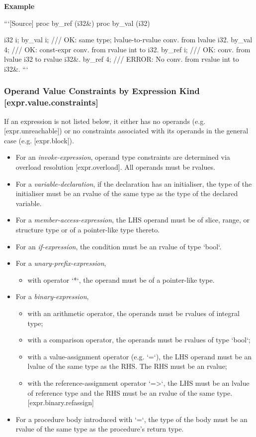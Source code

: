 \documentclass[a4paper, 12pt, oneside, final]{article}
\def\sref[#1]{[#1]}
\def\Example{\ifvmode\else\unskip\par\fi\noindent \textbf{Example}\par}
\begin{document}
\Example
```[Source]
proc by_ref (i32&) {}
proc by_val (i32) {}

i32 i;
by_val i; /// OK: same type; lvalue-to-rvalue conv. from lvalue i32.
by_val 4; /// OK: const-expr conv. from rvalue int to i32.
by_ref i; /// OK: conv. from lvalue i32 to rvalue i32&.
by_ref 4; /// ERROR: No conv. from rvalue int to i32&.
```

\subsubsection{Operand Value Constraints by Expression Kind [expr.value.constraints]}
If an expression is not listed below, it either has no operands (e.g. \sref[expr.unreachable]) or no constraints
associated with its operands in the general case (e.g. \sref[expr.block]).

\begin{itemize}
\item For an \emph{invoke-expression}, operand type constraints are determined via overload resolution \sref[expr.overload].
      All operands must be rvalues.
\item For a \emph{variable-declaration}, if the declaration has an initialiser, the type of the initialiser must be
      an rvalue of the same type as the type of the declared variable.
\item For a \emph{member-access-expression}, the LHS operand must be of slice, range, or structure type or of
      a pointer-like type thereto.
\item For an \emph{if-expression}, the condition must be an rvalue of type `bool`.
\item For a \emph{unary-prefix-expression},
      \begin{itemize}
        \item with operator `*`, the operand must be of a pointer-like type.
      \end{itemize}
\item For a \emph{binary-expression},
      \begin{itemize}
          \item with an arithmetic operator, the operands must be rvalues of integral type;
          \item with a comparison operator, the operands must be rvalues of type `bool`;
          \item with a value-assignment operator (e.g. `=`), the LHS operand must be an lvalue
                of the same type as the RHS. The RHS must be an rvalue;
          \item with the reference-assignment operator `=>`, the LHS must be an lvalue of reference type
                and the RHS must be an rvalue of the same type. \sref[expr.binary.refassign]
      \end{itemize}
\item For a procedure body introduced with `=`, the type of the body must be an rvalue of the same
      type as the procedure’s return type.
\end{itemize}
\end{document}

